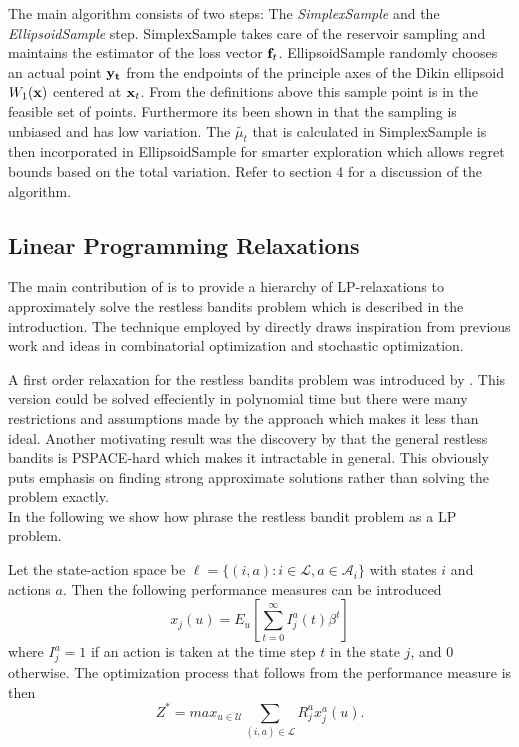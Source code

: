 The main algorithm consists of two steps: The \textit{SimplexSample} and the \textit{EllipsoidSample} step.
SimplexSample takes care of the reservoir sampling and maintains the estimator of the loss vector
${\bf f}_t$. EllipsoidSample randomly chooses an actual point ${\bf y_t}$ from the endpoints of the
principle axes of the Dikin ellipsoid $W_1({\bf x})$ centered at ${\bf x}_t$. From the definitions above this sample point is in the feasible set of points. Furthermore its been shown in \citep{abernethy} that the sampling is unbiased and has low variation. The $\tilde{\mu_t}$ that is calculated in SimplexSample is then incorporated in EllipsoidSample for smarter exploration which allows regret bounds based on the total
variation. Refer to section 4 for a discussion of the algorithm.



\subsection{Linear Programming Relaxations}
The main contribution of \citep{bertsimas} is to provide a hierarchy of LP-relaxations
to approximately solve the restless bandits problem which is described in the introduction. The technique employed by \citep{bertsimas} directly draws inspiration from previous work and ideas in combinatorial optimization and stochastic optimization. 

A first order relaxation for the restless bandits problem was introduced by \citep{whittle}. This version could be solved effeciently in polynomial time but there were many restrictions and assumptions made by the approach which makes it less than ideal. Another motivating result was the discovery by \citep{papad} that the general restless bandits is PSPACE-hard which makes it intractable in general. This obviously puts  emphasis on finding strong approximate solutions rather than solving the problem exactly. \\ 

In the following we show how \citep{bertsimas} phrase the restless bandit problem as a LP problem. 

Let the state-action space be  $\ell= \{(i,a): i \in \mathcal{L}, a \in  \mathcal{A}_i \}$
with states $i$ and actions $a$. Then the following performance measures can be introduced
$$x_j(u) = E_u[\sum_{t=0}^{\infty}I_j^a(t) \beta^t]$$
where $I_j^a = 1$ if an action is taken at the time step $t$ in the state $j$, and $0$ otherwise. The optimization process that follows from the performance measure is then 
$$Z^* = max_{u \in \mathcal{U}} \sum_{(i,a) \in \mathcal{L}} R_j^a x_j^a(u).$$  

